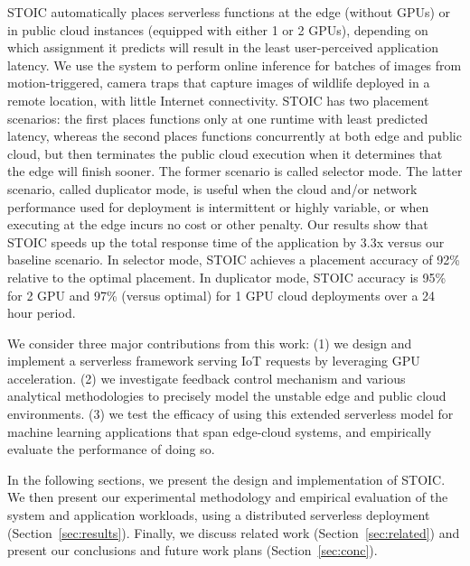 STOIC automatically places serverless functions at the edge (without GPUs) or in public
cloud instances (equipped with either 1 or 2 GPUs), depending on which
assignment it
predicts will result in the least user-perceived application latency. 
We use the system to perform online
inference for batches of images from motion-triggered, camera traps that
capture images of wildlife deployed in a remote location, with little Internet
connectivity.
STOIC has two placement scenarios: the first
places functions only at one runtime with least predicted latency, whereas the
second places functions concurrently at both edge and public cloud, but then
terminates the public cloud execution when it determines that the edge will
finish sooner.
The former scenario
is called selector mode. The latter scenario, called duplicator mode, is
useful when the cloud and/or network performance used for deployment is
intermittent or highly variable, or when executing at the edge incurs no
cost or other penalty. Our results show that STOIC speeds up the total response time of the
application by 3.3x versus our baseline scenario. In selector mode, STOIC
achieves a placement accuracy of 92\% relative to the optimal placement.  In duplicator mode, STOIC accuracy is
95\% for 2 GPU and 97\% (versus optimal) for 1 GPU cloud deployments over a 24 hour period.

We consider three major contributions from this work: (1) we design and
implement a serverless framework serving IoT requests by leveraging GPU
acceleration. (2) we investigate feedback control mechanism and various
analytical methodologies to precisely model the unstable edge and public cloud
environments. (3) we test the efficacy of using this extended serverless model
for machine learning applications that span edge-cloud systems, and
empirically evaluate the performance of doing so. 

In the following sections, we present the design and implementation of STOIC.
We then present our experimental methodology and empirical evaluation of the
system and application workloads, using a distributed serverless deployment
(Section~\ref{sec:results}). Finally, we discuss related work
(Section~\ref{sec:related}) and present our conclusions and future work plans
(Section~\ref{sec:conc}).

